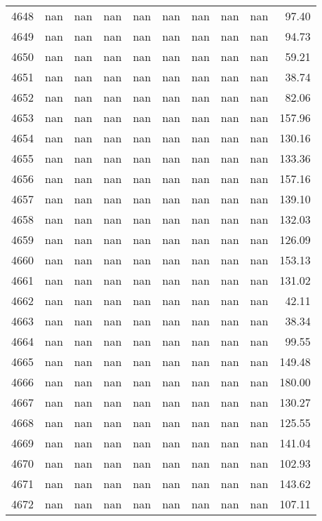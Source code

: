 \begin{tabular}{lrrrrrrrrr}
4648 & nan & nan & nan & nan & nan & nan & nan & nan & 97.40 \\
4649 & nan & nan & nan & nan & nan & nan & nan & nan & 94.73 \\
4650 & nan & nan & nan & nan & nan & nan & nan & nan & 59.21 \\
4651 & nan & nan & nan & nan & nan & nan & nan & nan & 38.74 \\
4652 & nan & nan & nan & nan & nan & nan & nan & nan & 82.06 \\
4653 & nan & nan & nan & nan & nan & nan & nan & nan & 157.96 \\
4654 & nan & nan & nan & nan & nan & nan & nan & nan & 130.16 \\
4655 & nan & nan & nan & nan & nan & nan & nan & nan & 133.36 \\
4656 & nan & nan & nan & nan & nan & nan & nan & nan & 157.16 \\
4657 & nan & nan & nan & nan & nan & nan & nan & nan & 139.10 \\
4658 & nan & nan & nan & nan & nan & nan & nan & nan & 132.03 \\
4659 & nan & nan & nan & nan & nan & nan & nan & nan & 126.09 \\
4660 & nan & nan & nan & nan & nan & nan & nan & nan & 153.13 \\
4661 & nan & nan & nan & nan & nan & nan & nan & nan & 131.02 \\
4662 & nan & nan & nan & nan & nan & nan & nan & nan & 42.11 \\
4663 & nan & nan & nan & nan & nan & nan & nan & nan & 38.34 \\
4664 & nan & nan & nan & nan & nan & nan & nan & nan & 99.55 \\
4665 & nan & nan & nan & nan & nan & nan & nan & nan & 149.48 \\
4666 & nan & nan & nan & nan & nan & nan & nan & nan & 180.00 \\
4667 & nan & nan & nan & nan & nan & nan & nan & nan & 130.27 \\
4668 & nan & nan & nan & nan & nan & nan & nan & nan & 125.55 \\
4669 & nan & nan & nan & nan & nan & nan & nan & nan & 141.04 \\
4670 & nan & nan & nan & nan & nan & nan & nan & nan & 102.93 \\
4671 & nan & nan & nan & nan & nan & nan & nan & nan & 143.62 \\
4672 & nan & nan & nan & nan & nan & nan & nan & nan & 107.11 \\

\end{tabular}
